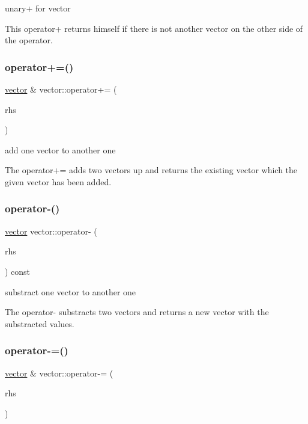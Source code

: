 unary+ for vector 

This operator+ returns himself if there is not another vector on the other side of the operator. \mbox{\label{classvector_a401c12597814627f350a8cd663b6dba5}} 
\subsubsection{\texorpdfstring{operator+=()}{operator+=()}}
{\footnotesize\ttfamily \hyperlink{classvector}{vector} \& vector\+::operator+= (\begin{DoxyParamCaption}\item[{const \hyperlink{classvector}{vector} \&}]{rhs }\end{DoxyParamCaption})}



add one vector to another one 

The operator+= adds two vectors up and returns the existing vector which the given vector has been added. \mbox{\label{classvector_a35999c3c2b222c116a4a8fca73cda8a9}} 
\subsubsection{\texorpdfstring{operator-\/()}{operator-()}}
{\footnotesize\ttfamily \hyperlink{classvector}{vector} vector\+::operator-\/ (\begin{DoxyParamCaption}\item[{const \hyperlink{classvector}{vector} \&}]{rhs }\end{DoxyParamCaption}) const}



substract one vector to another one 

The operator-\/ substracts two vectors and returns a new vector with the substracted values. \mbox{\label{classvector_a9229a3d50eae5ce544f81419d49540ce}} 
\subsubsection{\texorpdfstring{operator-\/=()}{operator-=()}}
{\footnotesize\ttfamily \hyperlink{classvector}{vector} \& vector\+::operator-\/= (\begin{DoxyParamCaption}\item[{const \hyperlink{classvector}{vector} \&}]{rhs }\end{DoxyParamCaption})}



